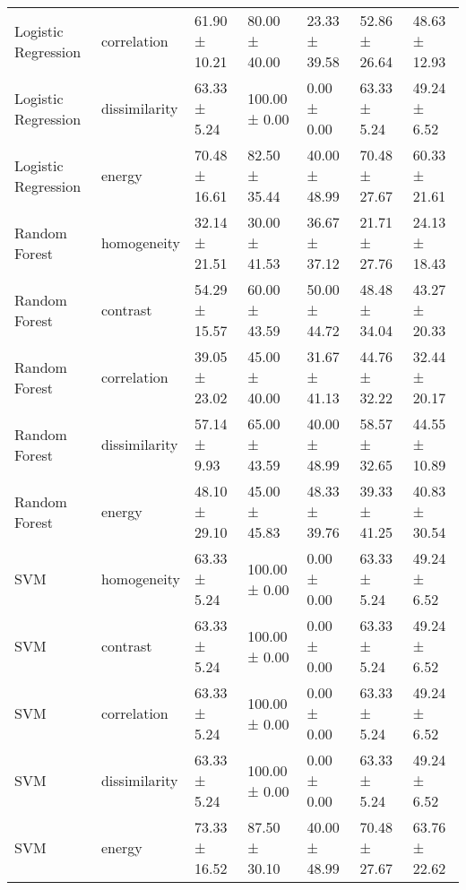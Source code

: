 \begin{tabular}{lllllll}
Logistic Regression & correlation & 61.90 ± 10.21 & 80.00 ± 40.00 & 23.33 ± 39.58 & 52.86 ± 26.64 & 48.63 ± 12.93 \\
Logistic Regression & dissimilarity & 63.33 ± 5.24 & 100.00 ± 0.00 & 0.00 ± 0.00 & 63.33 ± 5.24 & 49.24 ± 6.52 \\
Logistic Regression & energy & 70.48 ± 16.61 & 82.50 ± 35.44 & 40.00 ± 48.99 & 70.48 ± 27.67 & 60.33 ± 21.61 \\
Random Forest & homogeneity & 32.14 ± 21.51 & 30.00 ± 41.53 & 36.67 ± 37.12 & 21.71 ± 27.76 & 24.13 ± 18.43 \\
Random Forest & contrast & 54.29 ± 15.57 & 60.00 ± 43.59 & 50.00 ± 44.72 & 48.48 ± 34.04 & 43.27 ± 20.33 \\
Random Forest & correlation & 39.05 ± 23.02 & 45.00 ± 40.00 & 31.67 ± 41.13 & 44.76 ± 32.22 & 32.44 ± 20.17 \\
Random Forest & dissimilarity & 57.14 ± 9.93 & 65.00 ± 43.59 & 40.00 ± 48.99 & 58.57 ± 32.65 & 44.55 ± 10.89 \\
Random Forest & energy & 48.10 ± 29.10 & 45.00 ± 45.83 & 48.33 ± 39.76 & 39.33 ± 41.25 & 40.83 ± 30.54 \\
SVM & homogeneity & 63.33 ± 5.24 & 100.00 ± 0.00 & 0.00 ± 0.00 & 63.33 ± 5.24 & 49.24 ± 6.52 \\
SVM & contrast & 63.33 ± 5.24 & 100.00 ± 0.00 & 0.00 ± 0.00 & 63.33 ± 5.24 & 49.24 ± 6.52 \\
SVM & correlation & 63.33 ± 5.24 & 100.00 ± 0.00 & 0.00 ± 0.00 & 63.33 ± 5.24 & 49.24 ± 6.52 \\
SVM & dissimilarity & 63.33 ± 5.24 & 100.00 ± 0.00 & 0.00 ± 0.00 & 63.33 ± 5.24 & 49.24 ± 6.52 \\
SVM & energy & 73.33 ± 16.52 & 87.50 ± 30.10 & 40.00 ± 48.99 & 70.48 ± 27.67 & 63.76 ± 22.62 \\
\bottomrule
\end{tabular}
